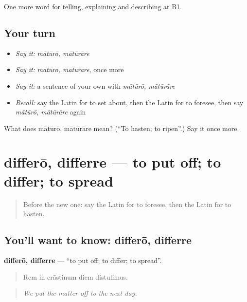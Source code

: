 \begin{grammarlens}[title={What you've built}]
One more word for telling, explaining and describing at B1.
\end{grammarlens}

\subsection*{Your turn}
\begin{itemize}
\raggedright
  \item \emph{Say it:} \emph{mātūrō, mātūrāre}
  \item \emph{Say it:} \emph{mātūrō, mātūrāre}, once more
  \item \emph{Say it:} a sentence of your own with \emph{mātūrō, mātūrāre}
  \item \emph{Recall:} say the Latin for to set about, then the Latin for to foresee, then say \emph{mātūrō, mātūrāre} again
\end{itemize}

\begin{tcolorbox}[breakable,colback=teal!4,colframe=teal!35!black,title={Before you move on}]
What does mātūrō, mātūrāre mean? (\textquotedblleft{}To hasten; to ripen\textquotedblright{}.) Say it once more.
\end{tcolorbox}
\section[differō, differre]{differō, differre — to put off; to differ; to spread}

\label{lesson:LA-C395-differo}



\begin{quote}
Before the new one: say the Latin for to foresee, then the Latin for to hasten.
\end{quote}

\subsection*{You'll want to know: differō, differre}
\textbf{differō, differre} — \textquotedblleft{}to put off; to differ; to spread\textquotedblright{}.

\begin{quote}
Rem in crāstinum diem distulimus.
\end{quote}

\begin{quote}
\emph{We put the matter off to the next day.}
\end{quote}

